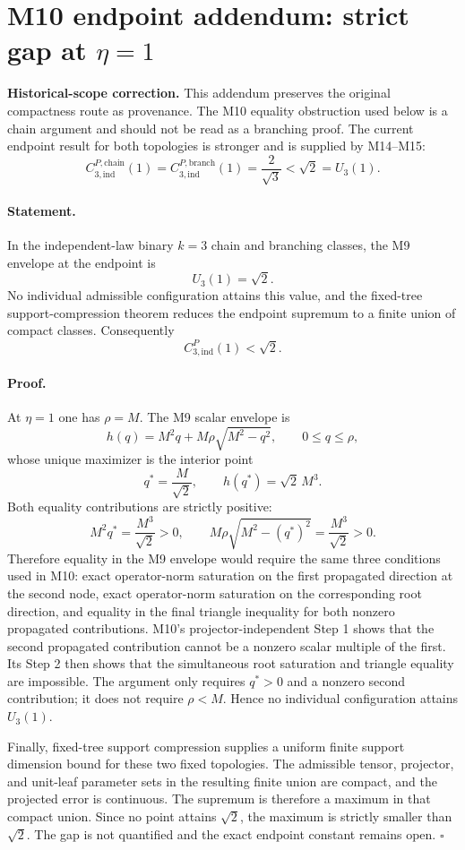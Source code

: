 \section*{M10 endpoint addendum: strict gap at $\eta=1$}
\label{sec:m10-endpoint-eta-one}

\textbf{Historical-scope correction.} This addendum preserves the original
compactness route as provenance. The M10 equality obstruction used below is a
chain argument and should not be read as a branching proof. The current
endpoint result for both topologies is stronger and is supplied by M14--M15:
\[
 C_{3,\mathrm{ind}}^{P,\mathrm{chain}}(1)
 =C_{3,\mathrm{ind}}^{P,\mathrm{branch}}(1)
 =\frac{2}{\sqrt3}<\sqrt2=U_3(1).
\]

\paragraph{Statement.}
In the independent-law binary $k=3$ chain and branching classes, the M9
envelope at the endpoint is
\[
  U_3(1)=\sqrt{2}.
\]
No individual admissible configuration attains this value, and the fixed-tree
support-compression theorem reduces the endpoint supremum to a finite union
of compact classes.  Consequently
\[
  C_{3,\mathrm{ind}}^P(1)<\sqrt{2}.
\]

\paragraph{Proof.}
At $\eta=1$ one has $\rho=M$.  The M9 scalar envelope is
\[
 h(q)=M^2q+M\rho\sqrt{M^2-q^2},
 \qquad 0\le q\le\rho,
\]
whose unique maximizer is the interior point
\[
 q^*=\frac{M}{\sqrt2},
 \qquad h(q^*)=\sqrt2\,M^3.
\]
Both equality contributions are strictly positive:
\[
 M^2q^*=\frac{M^3}{\sqrt2}>0,
 \qquad
 M\rho\sqrt{M^2-(q^*)^2}=\frac{M^3}{\sqrt2}>0.
\]
Therefore equality in the M9 envelope would require the same three
conditions used in M10: exact operator-norm saturation on the first
propagated direction at the second node, exact operator-norm saturation on
the corresponding root direction, and equality in the final triangle
inequality for both nonzero propagated contributions.  M10's
projector-independent Step 1 shows that the second propagated contribution
cannot be a nonzero scalar multiple of the first.  Its Step 2 then shows that
the simultaneous root saturation and triangle equality are impossible.  The
argument only requires $q^*>0$ and a nonzero second contribution; it does not
require $\rho<M$.  Hence no individual configuration attains $U_3(1)$.

Finally, fixed-tree support compression supplies a uniform finite support
dimension bound for these two fixed topologies.  The admissible tensor,
projector, and unit-leaf parameter sets in the resulting finite union are
compact, and the projected error is continuous.  The supremum is therefore a
maximum in that compact union.  Since no point attains $\sqrt2$, the maximum
is strictly smaller than $\sqrt2$.  The gap is not quantified and the exact
endpoint constant remains open. $\square$
